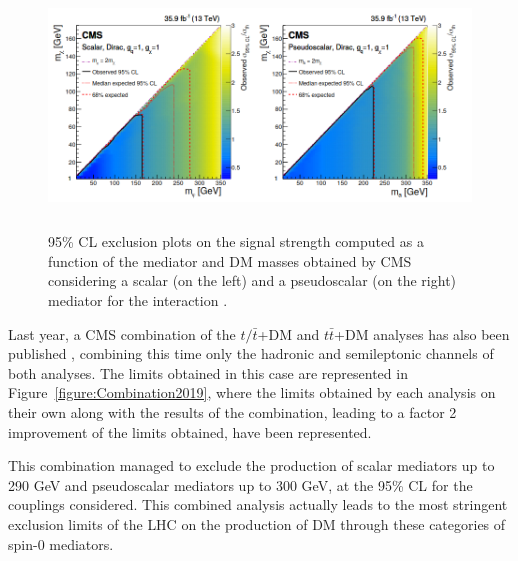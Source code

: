 \documentclass[a4paper, 10pt, openright]{report}
\begin{document}
\begin{figure}[htbp]
\begin{center}
\includegraphics[width=16cm, height=6.5cm]{figs/CMSttbarExclusion.png}
\caption{95\% \ac{CL} exclusion plots on the signal strength computed as a function of the mediator and \ac{DM} masses obtained by \ac{CMS} considering a scalar (on the left) and a pseudoscalar (on the right) mediator for the interaction \cite{PreviousDoubleTopAllLep13CMS}.}
\label{figure:CMSttbarExclusion}
\end{center}
\end{figure}

Last year, a \ac{CMS} combination of the $t/\bar t$+DM and $t \bar t$+DM analyses has also been published \cite{PreviousSingleDoubleTopAllLep13CMS}, combining this time only the hadronic and semileptonic channels of both analyses. The limits obtained in this case are represented in Figure~\ref{figure:Combination2019}, where the limits obtained by each analysis on their own along with the results of the combination, leading to a factor 2 improvement of the limits obtained, have been represented. 

This combination managed to exclude the production of scalar mediators up to 290 GeV and pseudoscalar mediators up to 300 GeV, at the 95\% \ac{CL} for the couplings considered. This combined analysis actually leads to the most stringent exclusion limits of the \ac{LHC} on the production of \ac{DM} through these categories of spin-0 mediators.
\end{document}
